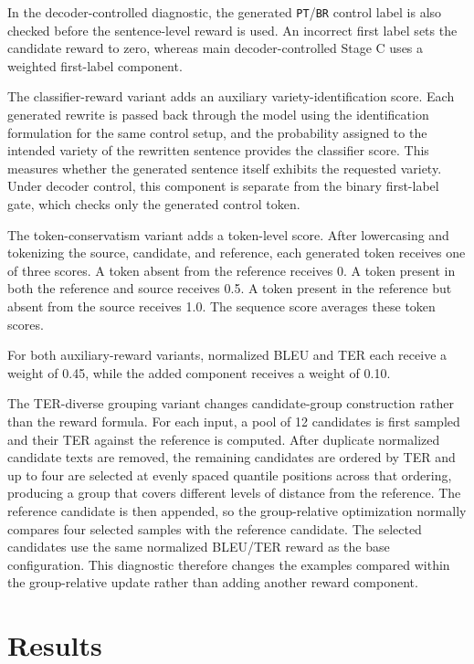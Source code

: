 In the decoder-controlled diagnostic, the generated \texttt{PT}/\texttt{BR}
control label is also checked before the sentence-level reward is used. An incorrect first label sets the candidate reward to zero, whereas main
decoder-controlled Stage C uses a weighted first-label component.

The classifier-reward variant adds an auxiliary variety-identification score.
Each generated rewrite is passed back through the model using the identification
formulation for the same control setup, and the probability assigned to the
intended variety of the rewritten sentence provides the classifier score. This
measures whether the generated sentence itself exhibits the requested variety.
Under decoder control, this component is separate from the binary first-label
gate, which checks only the generated control token.

The token-conservatism variant adds a token-level score. After lowercasing and
tokenizing the source, candidate, and reference, each generated token receives one of three scores.
A token absent from the reference receives 0. A token present in both the
reference and source receives 0.5. A token present in the reference but absent
from the source receives 1.0. The sequence score averages these token scores.

For both auxiliary-reward variants, normalized BLEU and TER each receive a
weight of 0.45, while the added component receives a weight of 0.10.

The TER-diverse grouping variant changes candidate-group construction rather
than the reward formula. For each input, a pool of 12 candidates is first
sampled and their TER against the reference is computed. After duplicate
normalized candidate texts are removed, the remaining candidates are ordered
by TER and up to four are selected at evenly spaced quantile positions across that
ordering, producing a group that covers different levels of distance from the
reference. The reference candidate is then appended, so the group-relative
optimization normally compares four selected samples with the reference
candidate. The selected candidates use the same normalized BLEU/TER reward as
the base configuration. This diagnostic therefore changes the examples compared
within the group-relative update rather than adding another reward component.

\section{Results}

